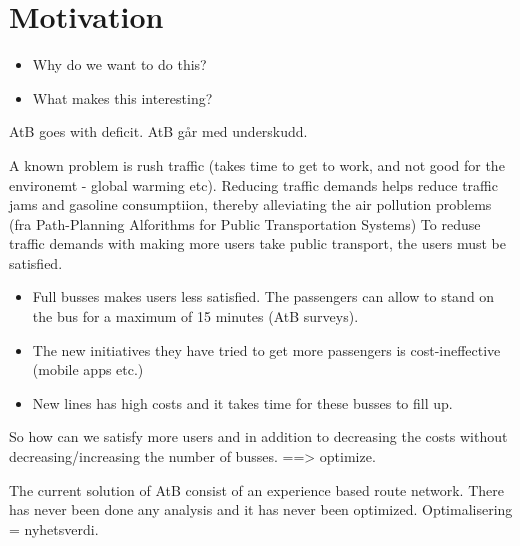 \section{Motivation}
\begin{itemize}
\item Why do we want to do this?
\item What makes this interesting?
\end{itemize}

AtB goes with deficit. AtB går med underskudd. \par
A known problem is rush traffic (takes time to get to work, and not good for the environemt - global warming etc). Reducing traffic demands helps reduce traffic jams and gasoline consumptiion, thereby alleviating the air pollution problems (fra Path-Planning Alforithms for Public Transportation Systems) To reduse traffic demands with making more
users take public transport, the users must be satisfied. 
\begin{itemize}
\item Full busses makes users less satisfied. The passengers can allow to stand on the bus for a maximum of 15 minutes (AtB surveys). 
\item The new initiatives they have tried to get more passengers is cost-ineffective (mobile apps etc.) 
\item New lines has high costs and it takes time for these busses to fill up. 
\end{itemize}
\par
So how can we satisfy more users and in addition to decreasing the costs without decreasing/increasing the number of busses. ==> optimize. 
\par
The current solution of AtB consist of an experience based route network. There has never been done any analysis and it has never been optimized. Optimalisering = nyhetsverdi.




